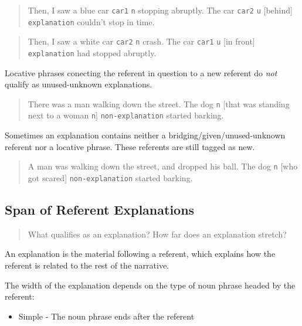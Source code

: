 \documentclass[
]{book}
\providecommand{\tightlist}{%
  \setlength{\itemsep}{0pt}\setlength{\parskip}{0pt}}
\begin{document}
\begin{quote}
Then, I saw a blue car \texttt{car1} \texttt{n} stopping abruptly.
The car \texttt{car2} \texttt{u} {[}behind{]} \texttt{explanation} couldn't stop in time.
\end{quote}

\begin{quote}
Then, I saw a white car \texttt{car2} \texttt{n} crash.
The car \texttt{car1} \texttt{u} {[}in front{]} \texttt{explanation} had stopped abruptly.
\end{quote}

Locative phrases conecting the referent in question to a new referent
do \emph{not} qualify as unused-unknown explanations.

\begin{quote}
There was a man walking down the street.
The dog \texttt{n}
{[}that was standing next to a woman \texttt{n}{]} \texttt{non-explanation} started barking.
\end{quote}

Sometimes an explanation contains neither
a bridging/given/unused-unknown referent nor a locative phrase.
These referents are still tagged as new.

\begin{quote}
A man was walking down the street, and dropped his ball.
The dog \texttt{n} {[}who got scared{]} \texttt{non-explanation} started barking.
\end{quote}

\hypertarget{span-of-referent-explanations}{%
\subsection{Span of Referent Explanations}\label{span-of-referent-explanations}}

\begin{quote}
What qualifies as an explanation?
How far does an explanation stretch?
\end{quote}

An explanation is the material following a referent,
which explains how the referent is related to the rest of the narrative.

The width of the explanation depends on the type of noun phrase headed by the referent:

\begin{itemize}
\tightlist
\item
  Simple - The noun phrase ends after the referent
\end{itemize}
\end{document}
